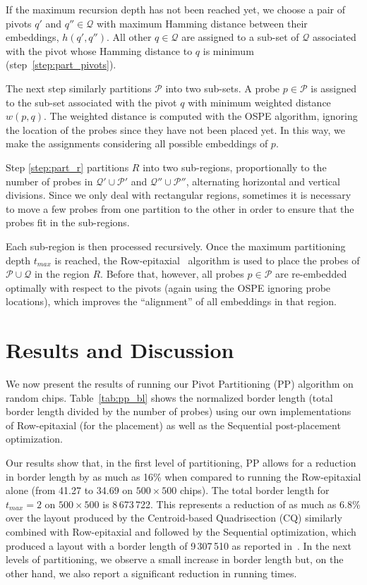\documentclass{llncs}
\begin{document}
If the maximum recursion depth has not been reached yet, we choose a pair of
pivots $q'$ and $q'' \in \mathcal{Q}$ with maximum Hamming distance
between their embeddings, $h(q',q'')$. All other $q \in \mathcal{Q}$ are
assigned to a sub-set of $\mathcal{Q}$ associated with the pivot whose
Hamming distance to $q$ is minimum (step~\ref{step:part_pivots}).

The next step similarly partitions $\mathcal{P}$ into two sub-sets. A probe
$p \in \mathcal{P}$ is assigned to the sub-set associated with the pivot $q$
with minimum weighted distance $w(p,q)$. The weighted distance is computed
with the OSPE algorithm, ignoring the location of the probes since they have
not been placed yet. In this way, we make the assignments considering all
possible embeddings of $p$.

Step \ref{step:part_r} partitions $R$ into two sub-regions, proportionally to the
number of probes in $\mathcal{Q}' \cup \mathcal{P}'$ and $\mathcal{Q}'' \cup \mathcal{P}''$,
alternating horizontal and vertical divisions.
Since we only deal with rectangular regions, sometimes it is necessary to move
a few probes from one partition to the other in order to ensure that the probes
fit in the sub-regions.

Each sub-region is then processed recursively. Once the maximum partitioning depth
$t_{max}$ is reached, the Row-epitaxial~\cite{KAHNG03A} algorithm is
used to place the probes of $\mathcal{P} \cup \mathcal{Q}$ in the region $R$.
Before that, however, all probes $p \in \mathcal{P}$ are re-embedded optimally
with respect to the pivots (again using the OSPE ignoring probe locations), which
improves the ``alignment'' of all embeddings in that region.

\section{Results and Discussion}
\label{sec:results}

We now present the results of running our Pivot Partitioning (PP) algorithm on
random chips. Table~\ref{tab:pp_bl} shows the normalized border length (total border
length divided by the number of probes) using our own implementations of Row-epitaxial
(for the placement) as well as the Sequential post-placement optimization.

Our results
show that, in the first level of partitioning, PP allows for a reduction in border length
by as much as 16\% when compared to running the Row-epitaxial alone (from 41.27 to
34.69 on $500\times 500$ chips). The total border length for $t_{max}=2$ on
$500\times 500$ is 8\,673\,722. This represents a reduction of as much as 6.8\% over
the layout produced by the Centroid-based Quadrisection (CQ) similarly combined with
Row-epitaxial and followed by the Sequential optimization, which produced a layout
with a border length of 9\,307\,510 as reported in~\cite{KAHNG03B}. In the next levels
of partitioning, we observe a small increase in border length but, on the other hand,
we also report a significant reduction in running times.
\end{document}
